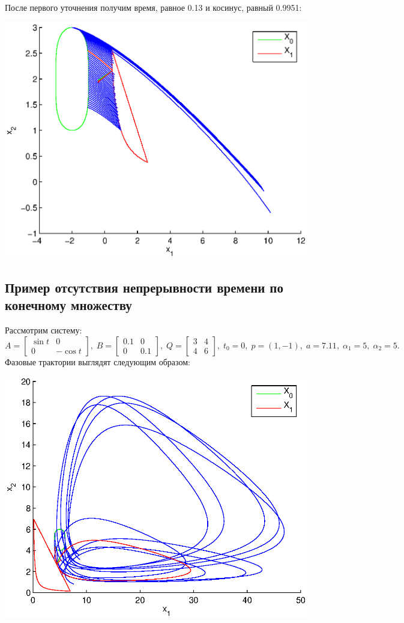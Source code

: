 \documentclass[11pt]{article}
\begin{document}
После первого уточнения получим время, равное 0.13 и косинус, равный 0.9951:

\includegraphics[scale=0.9]{pics/pic2_x_clar.eps}

\subsection{Пример отсутствия непрерывности времени по конечному множеству}
Рассмотрим систему:
$$
A = \left[
\begin{matrix}
\sin t & 0 \\
0 & -\cos t
\end{matrix}
\right], \;
B = \left[
\begin{matrix}
0.1 & 0 \\
0 & 0.1
\end{matrix}
\right], \;
Q = \left[
\begin{matrix}
3 & 4 \\
4 & 6
\end{matrix}
\right], \;
t_0 = 0, \; p = \left( 1, -1 \right), \; a = 7.11, \; \alpha_1 = 5, \; \alpha_2 = 5.
$$
Фазовые трактории выглядят следующим образом:

\includegraphics[scale=1]{pics/pic3_x_7.11.eps} \newline
\end{document}

